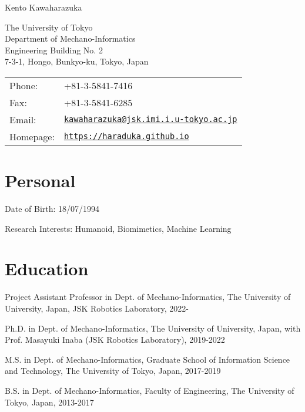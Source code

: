 \documentclass[letterpaper]{article}
\def\name{Kento Kawaharazuka}
\renewenvironment{itemize}{
  \begin{list}{}{
    \setlength{\leftmargin}{1.5em}
  }
}{
  \end{list}
}
\begin{document}
{\huge \name}

\vspace{0.25in}

\begin{minipage}{0.45\linewidth}
  {The University of Tokyo} \\
  Department of Mechano-Informatics \\
  Engineering Building No. 2 \\
  7-3-1, Hongo, Bunkyo-ku, Tokyo, Japan
\end{minipage}
\begin{minipage}{0.45\linewidth}
  \begin{tabular}{ll}
    Phone: & +81-3-5841-7416 \\
    Fax: &  +81-3-5841-6285 \\
    Email: & \href{mailto:kawaharazuka@jsk.imi.i.u-tokyo.ac.jp}{\tt kawaharazuka@jsk.imi.i.u-tokyo.ac.jp} \\
    Homepage: & \href{https://haraduka.github.io}{\tt https://haraduka.github.io} \\
  \end{tabular}
\end{minipage}


\section*{Personal}

\begin{itemize}
    \item Date of Birth: 18/07/1994
    \item Research Interests: Humanoid, Biomimetics, Machine Learning
\end{itemize}


\section*{Education}

\begin{itemize}
  \item Project Assistant Professor in Dept. of Mechano-Informatics, The University of University, Japan, JSK Robotics Laboratory, 2022-
  \item Ph.D. in Dept. of Mechano-Informatics, The University of University, Japan, with Prof. Masayuki Inaba (JSK Robotics Laboratory), 2019-2022
  \item M.S. in Dept. of Mechano-Informatics, Graduate School of Information Science and Technology, The University of Tokyo, Japan, 2017-2019
  \item B.S. in Dept. of Mechano-Informatics, Faculty of Engineering, The University of Tokyo, Japan, 2013-2017
\end{itemize}
\end{document}
